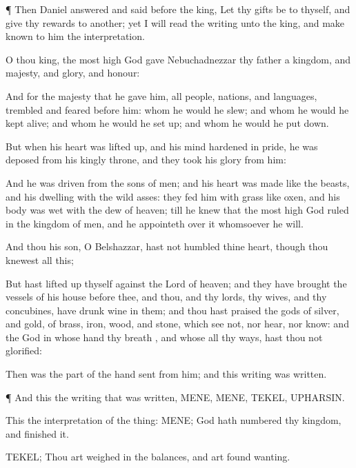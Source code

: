 {\par }{\PP {}¶
Then
Daniel
answered and
said
before the
king, Let thy
gifts
be to thyself, and
give thy
rewards to
another;
yet I will
read the
writing unto the
king, and make
known to him the
interpretation.

O
thou
king, the most
high
God
gave
Nebuchadnezzar thy
father a
kingdom, and
majesty, and
glory, and
honour:

And
for the
majesty that he
gave him,
all
people,
nations, and
languages,
trembled and
feared
before
him: whom he
would he
slew; and whom he
would he kept
alive; and whom he
would he set
up; and whom he
would he put
down.

But when his
heart was lifted
up, and his
mind
hardened in
pride, he was
deposed
from his
kingly
throne, and they
took his
glory from
him:

And he was
driven
from the
sons of
men; and his
heart was
made
like the
beasts, and his
dwelling
{} with the wild
asses: they
fed him with
grass like
oxen, and his
body was
wet with the
dew of
heaven;
till he
knew that the most
high
God
ruled in the
kingdom of
men, and
{} he
appointeth
over it
whomsoever he
will.

And
thou his
son, O
Belshazzar, hast
not
humbled thine
heart,
though thou
knewest
all
this;

But hast lifted
up thyself
against the
Lord of
heaven; and they have
brought the
vessels of his
house
before thee, and
thou, and thy
lords, thy
wives, and thy
concubines, have
drunk
wine in them; and thou hast
praised the
gods of
silver, and
gold, of
brass,
iron,
wood, and
stone, which
see
not,
nor
hear,
nor
know: and the
God in whose
hand thy
breath
{}, and whose
{}
all thy
ways, hast thou
not
glorified:

Then was the
part of the
hand
sent
from
him; and
this
writing was
written.


\par }{\PP {}¶ And
this
{} the
writing that was
written,
MENE,
MENE,
TEKEL,
UPHARSIN.

This
{} the
interpretation of the
thing:
MENE;
God hath
numbered thy
kingdom, and
finished it.

TEKEL; Thou art
weighed in the
balances, and art
found
wanting.

}
